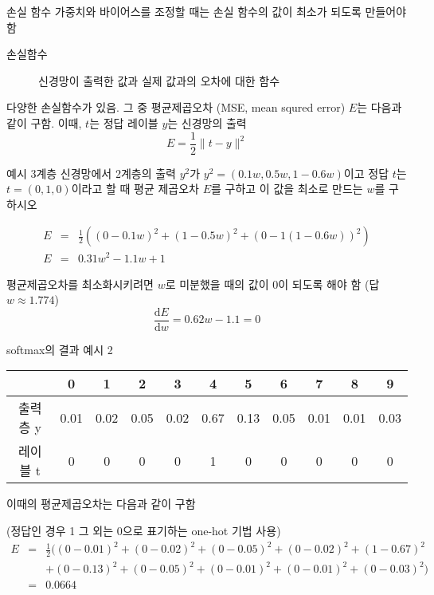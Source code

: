 \documentclass[10pt,t]{beamer}
\begin{document}
\begin{frame}{손실 함수}
    가중치와 바이어스를 조정할 때는 손실 함수의 값이 최소가 되도록 만들어야 함

    \begin{description}
        \item[손실함수] 신경망이 출력한 값과 실제 값과의 오차에 대한 함수 
    \end{description}

    다양한 손실함수가 있음. 그 중 평균제곱오차 (MSE, mean squred error) $E$는 다음과 같이 구함. 이때, $t$는 정답 레이블 $y$는 신경망의 출력
    \[E= \frac{1}{2}\| t- y\|^2\]

    \pagebreak
    
    \begin{block}{예시}
        3계층 신경망에서 2계층의 출력 $y^2$가 $y^2=(0.1w, 0.5w, 1-0.6w)$이고 정답 $t$는 $t=(0, 1, 0)$이라고 할 때 평균 제곱오차 $E$를 구하고 이 값을 최소로 만드는 $w$를 구하시오        
    \end{block}
\begin{eqnarray*}
    E &=& \frac{1}{2}((0-0.1w)^2+ (1-0.5w)^2 + (0-1(1-0.6w))^2 )\\
    E &=& 0.31w^2 - 1.1w +1
\end{eqnarray*}

평균제곱오차를 최소화시키려면 $w$로 미분했을 때의 값이 0이 되도록 해야 함 {\scriptsize(답 $w\approx 1.774$)}
\[\frac{\text{d}E}{\text{d}w} = 0.62w-1.1 = 0\]

softmax의 결과 예시 2
\begin{tabular}{*{11}{|c}|}\hline
    & 0 & 1 & 2 & 3 & 4 & 5 & 6 & 7 & 8 &  9  \\ \hline
    출력층 y & 0.01 & 0.02 & 0.05 & 0.02 & 0.67 & 0.13 & 0.05 & 0.01 & 0.01 & 0.03 \\ \hline
    레이블 t & 0 & 0 & 0 & 0 & 1 & 0 & 0 & 0 & 0 & 0 \\ \hline
\end{tabular}

이때의 평균제곱오차는 다음과 같이 구함

(정답인 경우 1 그 외는 0으로 표기하는 one-hot  기법 사용)
\begin{eqnarray*}
    E&=&\frac{1}{2} ( (0-0.01)^2+(0-0.02)^2+(0-0.05)^2+(0-0.02)^2+(1-0.67)^2\\
    && +(0-0.13)^2+(0-0.05)^2+(0-0.01)^2+(0-0.01)^2+(0-0.03)^2) \\
    &=& 0.0664
\end{eqnarray*}


\end{frame}
\end{document}
